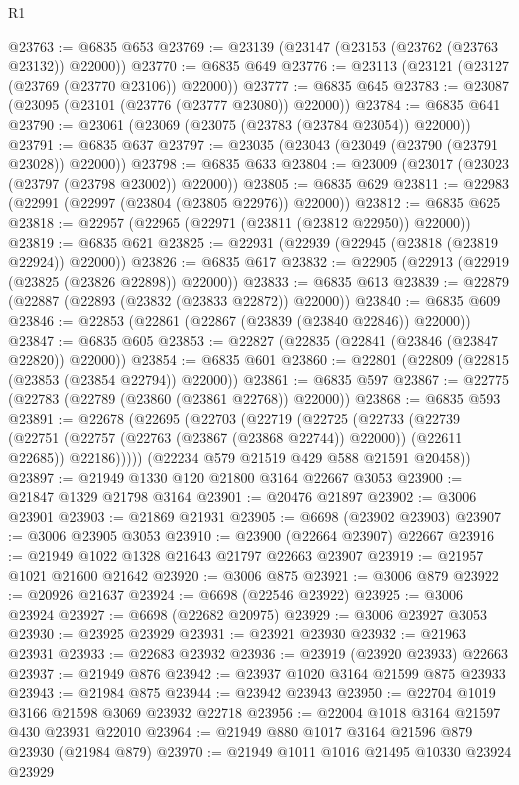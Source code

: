\begin{lexlean}{R1}
\begin{coremodule}
@23763 := @6835 @653
@23769 := @23139 (@23147 (@23153 (@23762 (@23763 @23132)) @22000))
@23770 := @6835 @649
@23776 := @23113 (@23121 (@23127 (@23769 (@23770 @23106)) @22000))
@23777 := @6835 @645
@23783 := @23087 (@23095 (@23101 (@23776 (@23777 @23080)) @22000))
@23784 := @6835 @641
@23790 := @23061 (@23069 (@23075 (@23783 (@23784 @23054)) @22000))
@23791 := @6835 @637
@23797 := @23035 (@23043 (@23049 (@23790 (@23791 @23028)) @22000))
@23798 := @6835 @633
@23804 := @23009 (@23017 (@23023 (@23797 (@23798 @23002)) @22000))
@23805 := @6835 @629
@23811 := @22983 (@22991 (@22997 (@23804 (@23805 @22976)) @22000))
@23812 := @6835 @625
@23818 := @22957 (@22965 (@22971 (@23811 (@23812 @22950)) @22000))
@23819 := @6835 @621
@23825 := @22931 (@22939 (@22945 (@23818 (@23819 @22924)) @22000))
@23826 := @6835 @617
@23832 := @22905 (@22913 (@22919 (@23825 (@23826 @22898)) @22000))
@23833 := @6835 @613
@23839 := @22879 (@22887 (@22893 (@23832 (@23833 @22872)) @22000))
@23840 := @6835 @609
@23846 := @22853 (@22861 (@22867 (@23839 (@23840 @22846)) @22000))
@23847 := @6835 @605
@23853 := @22827 (@22835 (@22841 (@23846 (@23847 @22820)) @22000))
@23854 := @6835 @601
@23860 := @22801 (@22809 (@22815 (@23853 (@23854 @22794)) @22000))
@23861 := @6835 @597
@23867 := @22775 (@22783 (@22789 (@23860 (@23861 @22768)) @22000))
@23868 := @6835 @593
@23891 := @22678
    (@22695
      (@22703
        (@22719
          (@22725
            (@22733
              (@22739
                (@22751 (@22757 (@22763 (@23867 (@23868 @22744)) @22000)) (@22611 @22685))
                @22186)))))
      (@22234 @579 @21519 @429 @588 @21591 @20458))
@23897 := @21949 @1330 @120 @21800 @3164 @22667 @3053
@23900 := @21847 @1329 @21798 @3164
@23901 := @20476 @21897
@23902 := @3006 @23901
@23903 := @21869 @21931
@23905 := @6698 (@23902 @23903)
@23907 := @3006 @23905 @3053
@23910 := @23900 (@22664 @23907) @22667
@23916 := @21949 @1022 @1328 @21643 @21797 @22663 @23907
@23919 := @21957 @1021 @21600 @21642
@23920 := @3006 @875
@23921 := @3006 @879
@23922 := @20926 @21637
@23924 := @6698 (@22546 @23922)
@23925 := @3006 @23924
@23927 := @6698 (@22682 @20975)
@23929 := @3006 @23927 @3053
@23930 := @23925 @23929
@23931 := @23921 @23930
@23932 := @21963 @23931
@23933 := @22683 @23932
@23936 := @23919 (@23920 @23933) @22663
@23937 := @21949 @876
@23942 := @23937 @1020 @3164 @21599 @875 @23933
@23943 := @21984 @875
@23944 := @23942 @23943
@23950 := @22704 @1019 @3166 @21598 @3069 @23932 @22718
@23956 := @22004 @1018 @3164 @21597 @430 @23931 @22010
@23964 := @21949 @880 @1017 @3164 @21596 @879 @23930 (@21984 @879)
@23970 := @21949 @1011 @1016 @21495 @10330 @23924 @23929

\end{coremodule}
\end{lexlean}
